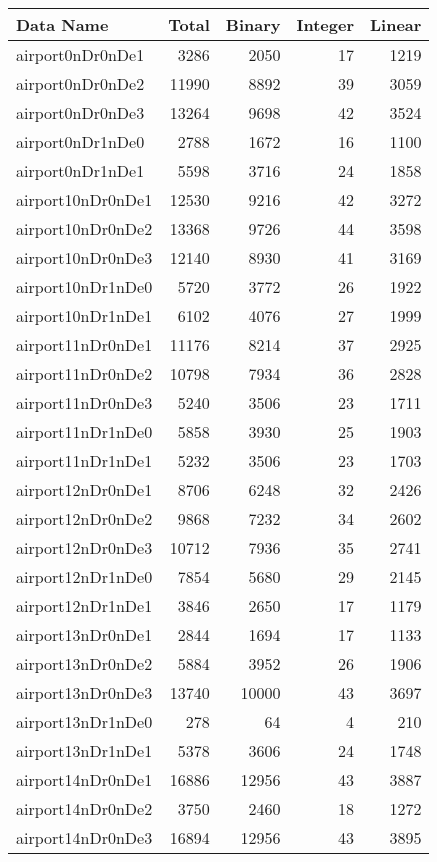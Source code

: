 \begin{tabular}{lrrrr}
\toprule
Data Name & Total & Binary & Integer & Linear \\
\midrule
airport0nDr0nDe1 & 3286 & 2050 & 17 & 1219 \\
airport0nDr0nDe2 & 11990 & 8892 & 39 & 3059 \\
airport0nDr0nDe3 & 13264 & 9698 & 42 & 3524 \\
airport0nDr1nDe0 & 2788 & 1672 & 16 & 1100 \\
airport0nDr1nDe1 & 5598 & 3716 & 24 & 1858 \\
airport10nDr0nDe1 & 12530 & 9216 & 42 & 3272 \\
airport10nDr0nDe2 & 13368 & 9726 & 44 & 3598 \\
airport10nDr0nDe3 & 12140 & 8930 & 41 & 3169 \\
airport10nDr1nDe0 & 5720 & 3772 & 26 & 1922 \\
airport10nDr1nDe1 & 6102 & 4076 & 27 & 1999 \\
airport11nDr0nDe1 & 11176 & 8214 & 37 & 2925 \\
airport11nDr0nDe2 & 10798 & 7934 & 36 & 2828 \\
airport11nDr0nDe3 & 5240 & 3506 & 23 & 1711 \\
airport11nDr1nDe0 & 5858 & 3930 & 25 & 1903 \\
airport11nDr1nDe1 & 5232 & 3506 & 23 & 1703 \\
airport12nDr0nDe1 & 8706 & 6248 & 32 & 2426 \\
airport12nDr0nDe2 & 9868 & 7232 & 34 & 2602 \\
airport12nDr0nDe3 & 10712 & 7936 & 35 & 2741 \\
airport12nDr1nDe0 & 7854 & 5680 & 29 & 2145 \\
airport12nDr1nDe1 & 3846 & 2650 & 17 & 1179 \\
airport13nDr0nDe1 & 2844 & 1694 & 17 & 1133 \\
airport13nDr0nDe2 & 5884 & 3952 & 26 & 1906 \\
airport13nDr0nDe3 & 13740 & 10000 & 43 & 3697 \\
airport13nDr1nDe0 & 278 & 64 & 4 & 210 \\
airport13nDr1nDe1 & 5378 & 3606 & 24 & 1748 \\
airport14nDr0nDe1 & 16886 & 12956 & 43 & 3887 \\
airport14nDr0nDe2 & 3750 & 2460 & 18 & 1272 \\
airport14nDr0nDe3 & 16894 & 12956 & 43 & 3895 \\

\end{tabular}
